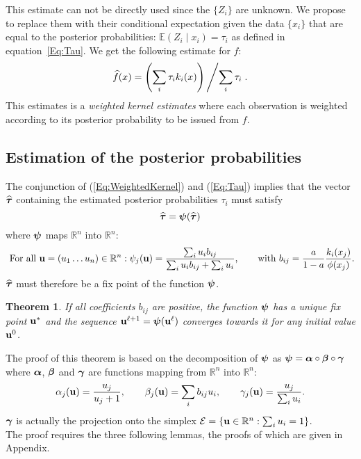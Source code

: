 \documentclass[10pt]{article}
\newcommand{\ubf}{{\bf u}}
\newcommand{\alphabf}{\mbox{\mathversion{bold}{$\alpha$}}}
\newcommand{\betabf}{\mbox{\mathversion{bold}{$\beta$}}}
\newcommand{\gammabf}{\mbox{\mathversion{bold}{$\gamma$}}}
\newcommand{\psibf}{\mbox{\mathversion{bold}{$\psi$}}}
\newcommand{\taubf}{\mbox{\mathversion{bold}{$\tau$}}}
\newcommand{\Rbb}{{\mathbb R}}
\newcommand{\Ecal}{{\mathcal E}}
\newcommand{\Esp}{{\mathbb E}}
\newtheorem{theorem}{Theorem}
\begin{document}
This estimate can not be directly used since the $\{Z_i\}$ are unknown. We propose to replace them with their conditional expectation given the data $\{x_i\}$
that are equal to the posterior probabilities: $\Esp(Z_i \;|\; x_i) = \tau_i$ as defined in equation~\ref{Eq:Tau}. We get the following estimate for $f$:
\begin{equation} \label{Eq:WeightedKernel}
\widehat{f}(x) = \left(\sum_i \tau_i k_i(x)\right)
\left/ \sum_i \tau_i \right..
\end{equation}
This estimates is a {\em weighted kernel estimates} where each observation is weighted according to its posterior probability to be issued from $f$.


\subsection{Estimation of the posterior probabilities}

The conjunction of (\ref{Eq:WeightedKernel}) and (\ref{Eq:Tau})
implies that the vector $\widehat{\taubf}$ containing the estimated
posterior probabilities $\tau_i$ must satisfy
$$
\widehat{\taubf} = \psibf(\widehat{\taubf})
$$
where $\psibf$ maps $\Rbb^n$ into $\Rbb^n$:
\begin{equation} \label{Eq:Psi}
  \mbox{ For all } \ubf  = (u_1 \dots u_n) \in \Rbb^n: \psi_j(\ubf) =
  \frac{\sum_i u_i b_{ij}}{\sum_i u_i b_{ij}+ \sum_i u_i},
  \qquad \mbox{with } b_{ij} = \frac{a}{1-a} \frac{k_i(x_j)}{\phi(x_j)}.
\end{equation}
$\widehat{\taubf}$ must therefore be a fix point of the function
$\psibf$.

\begin{theorem} \label{Thm:Contract}
  If all coefficients $b_{ij}$ are positive, the function $\psibf$ has
  a unique fix point $\ubf^*$ and the sequence $\ubf^{\ell+1} =
  \psibf(\ubf^{\ell})$ converges towards it for any initial value
  $\ubf^0$.
\end{theorem}

The proof of this theorem is based on the decomposition of $\psibf$ as
$\psibf = \alphabf \circ \betabf \circ \gammabf$ where $\alphabf$,
$\betabf$ and $\gammabf$ are functions mapping from $\Rbb^n$ into
$\Rbb^n$:
$$
\alpha_j(\ubf) = \frac{u_j}{u_j + 1},
\qquad
\beta_j(\ubf) = \sum_i b_{ij} u_i,
\qquad
\gamma_j(\ubf) = \frac{u_j}{\sum_i u_i}.
$$
$\gammabf$ is actually the projection onto the simplex
$\Ecal = \{\ubf \in \Rbb^n: \sum_i u_i = 1\}$. \\
The proof requires the three following lemmas, the proofs of which are
given in Appendix.
\end{document}
